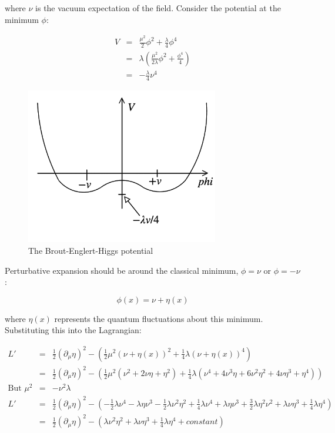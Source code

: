 where $\nu$ is the vacuum expectation of the field.  Consider the potential at the minimum $\phi$:

\begin{eqnarray*}
  V & = & \frac{\mu^2}{2}\phi^2 + \frac{\lambda}{4}\phi^4 \\
    & = & \lambda\left( \frac{\mu^2}{2\lambda}\phi^2 + \frac{\phi^4}{4}\right) \\
    & = & -\frac{\lambda}{4}\nu^4
\end{eqnarray*}

\begin{figure}[!htb]
  \begin{center}
    \includegraphics[width=0.75\textwidth]{images/web_feynman/image_83.png}
    \caption[The BEH potential]{The Brout-Englert-Higgs potential}
    \label{fig:ch16_potential}
  \end{center}
\end{figure}

Perturbative expansion should be around the classical minimum, $\phi = \nu$ or $\phi = -\nu$:

\[
  \phi(x) = \nu + \eta(x)
\]

where $\eta(x)$ represents the quantum fluctuations about this minimum.  Substituting this into the Lagrangian:

\begin{eqnarray*}
  L' & = & \frac{1}{2}\left(\partial_{\mu}\eta\right)^2 - \left(\frac{1}{2}\mu^2\left(\nu + \eta(x)\right)^2 + \frac{1}{4}\lambda\left(\nu + \eta(x)\right)^4\right) \\
  & = & \frac{1}{2}\left(\partial_{\mu}\eta\right)^2 - \left(\frac{1}{2}\mu^2\left(\nu^2 + 2\nu\eta + \eta^2\right) + \frac{1}{4}\lambda\left(\nu^4 + 4\nu^3\eta + 6\nu^2\eta^2 + 4\nu\eta^3 + \eta^4\right)\right) \\
  \textrm{But } \mu^2 & = & -\nu^2\lambda \\
  L' & = & \frac{1}{2}\left(\partial_{\mu}\eta\right)^2 - \left(-\frac{1}{2}\lambda\nu^4 - \lambda\eta\nu^3 - \frac{1}{2}\lambda\nu^2\eta^2 + \frac{1}{4}\lambda\nu^4 + \lambda\eta\nu^3 + \frac{3}{2}\lambda\eta^2\nu^2 + \lambda\nu\eta^3 + \frac{1}{4}\lambda\eta^4\right) \\
  & = & \frac{1}{2}\left(\partial_{\mu}\eta\right)^2 - \left(\lambda\nu^2\eta^2 + \lambda\nu\eta^3 + \frac{1}{4}\lambda\eta^4 + constant\right)
\end{eqnarray*}

